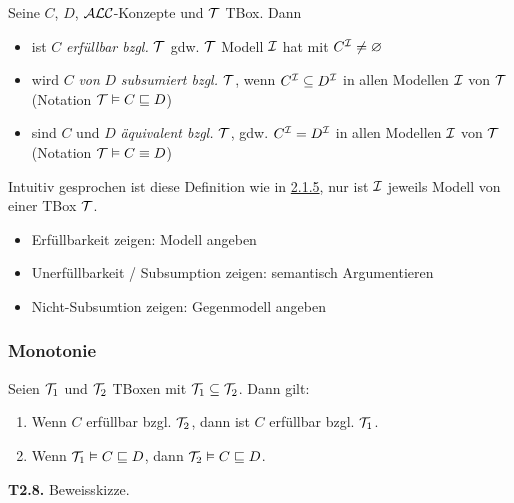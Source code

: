 \begin{definition} 
Seine $C$, $D$, $\mathcal{A}\mathcal{L}\mathcal{C}$-Konzepte und $\mathcal{T}$ TBox. Dann

\begin{itemize}
  \item ist $C$ \emph{erfüllbar bzgl.} $\mathcal{T}$ gdw. $\mathcal{T}$ Modell $\mathcal{I}$ hat mit $C^{\mathcal{I}} \neq \varnothing$
  \item wird $C$ \emph{von} $D$ \emph{subsumiert bzgl.} $\mathcal{T}$, wenn $C^{\mathcal{I}} \subseteq D^{\mathcal{I}}$ in allen Modellen $\mathcal{I}$ von $\mathcal{T}$ (Notation $\mathcal{T} \vDash C \sqsubseteq D$)
  \item sind $C$ und $D$ \emph{äquivalent bzgl.} $\mathcal{T}$, gdw. $C^{\mathcal{I}} = D^{\mathcal{I}}$ in allen Modellen $\mathcal{I}$ von $\mathcal{T}$ (Notation $\mathcal{T} \vDash C \equiv D$)
\end{itemize}
\end{definition}

Intuitiv gesprochen ist diese Definition wie in \protect\hyperlink{erfuxfcllbarkeit-subsumtion-uxe4quivalenz}{2.1.5}, nur ist $\mathcal{I}$ jeweils Modell von einer TBox $\mathcal{T}$.

\begin{itemize}
\item
  Erfüllbarkeit zeigen: Modell angeben
\item
  Unerfüllbarkeit / Subsumption zeigen: semantisch Argumentieren
\item
  Nicht-Subsumtion zeigen: Gegenmodell angeben
\end{itemize}

\subsubsection{Monotonie}\label{monotonie}

\begin{lemma}
Seien $\mathcal{T}_{1}$ und $\mathcal{T}_{2}$ TBoxen mit $\mathcal{T}_{1} \subseteq \mathcal{T}_{2}$. Dann gilt:
\end{lemma}

\begin{enumerate}
\def\labelenumi{\arabic{enumi}.}
\item
  Wenn $C$ erfüllbar bzgl. $\mathcal{T}_{2}$, dann ist $C$ erfüllbar bzgl.
  $\mathcal{T}_{1}$.
\item
  Wenn $\mathcal{T}_{1} \vDash C \sqsubseteq D$, dann
  $\mathcal{T}_{2} \vDash C \sqsubseteq D$.
\end{enumerate}

\textbf{T2.8.} Beweisskizze.

